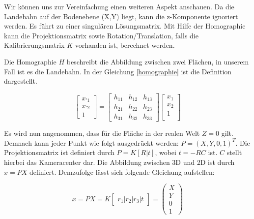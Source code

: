 \documentclass{ezb}
\begin{document}
Wir können uns zur Vereinfachung einen weiteren Aspekt anschauen. Da die Landebahn auf der Bodenebene (X,Y) liegt, kann die z-Komponente ignoriert werden. Es führt zu einer singulären Lösungsmatrix. Mit Hilfe der Homographie kann die Projektionsmatrix sowie Rotation/Translation, falls die Kalibrierungsmatrix $K$ vorhanden ist, berechnet werden.

Die Homographie $H$ beschreibt die Abbildung zwischen zwei Flächen, in unserem Fall ist es die Landebahn. In der Gleichung \ref{homographie} ist die Definition dargestellt.

\begin{equation} \label{homographie}
\begin{bmatrix}
x_{'1} \\
x_{'2} \\
1 
\end{bmatrix}
=
\begin{bmatrix}
h_{11} & h_{12} & h_{13} \\
h_{21} & h_{22} & h_{23} \\
h_{31} & h_{32} & h_{33} 
\end{bmatrix}
\begin{bmatrix}
x_{1} \\
x_{2} \\
1 \\
\end{bmatrix}
\end{equation} 

Es wird nun angenommen, dass für die Fläche in der realen Welt $Z=0$ gilt. Demnach kann jeder Punkt wie folgt ausgedrückt werden: $P=(X, Y, 0, 1)^T$.
Die Projektionsmatrix ist definiert durch $P=K[R|t]$, wobei $t=-RC$ ist. $C$ stellt hierbei das Kameracenter dar. Die Abbildung zwischen 3D und 2D ist durch $x=PX$ definiert. Demzufolge lässt sich folgende Gleichung aufstellen:

\begin{equation}
x=PX=K
\begin{bmatrix}
r_{1} | r_{2} | r_{3} | t 
\end{bmatrix}
=
\begin{pmatrix}
X \\
Y \\
0 \\
1
\end{pmatrix}
\end{equation} 
\end{document}
